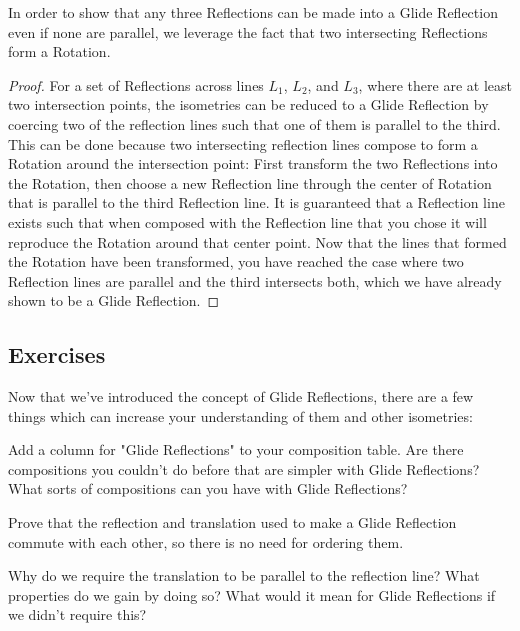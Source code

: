 \documentclass[11pt]{article}
\theoremstyle{definition}
\begin{document}
In order to show that any three Reflections can be made into a Glide
Reflection even if none are parallel, we leverage the fact that two
intersecting Reflections form a Rotation.

\begin{proof}
  For a set of Reflections across lines $L_{1}$, $L_{2}$, and $L_{3}$, where
  there are at least two intersection points, the isometries can be reduced to
  a Glide Reflection by coercing two of the reflection lines such that one of
  them is parallel to the third. This can be done because two intersecting
  reflection lines compose to form a Rotation around the intersection point:
  First transform the two Reflections into the Rotation, then choose a new
  Reflection line through the center of Rotation that is parallel to the third
  Reflection line. It is guaranteed that a Reflection line exists such that
  when composed with the Reflection line that you chose it will reproduce the
  Rotation around that center point. Now that the lines that formed the
  Rotation have been transformed, you have reached the case where two
  Reflection lines are parallel and the third intersects both, which we have
  already shown to be a Glide Reflection.
\end{proof}

\subsection{Exercises}

Now that we've introduced the concept of Glide Reflections, there are a few
things which can increase your understanding of them and other isometries:
\begin{enumeration}
\item Add a column for "Glide Reflections" to your composition table. Are there
  compositions you couldn't do before that are simpler with Glide Reflections?
  What sorts of compositions can you have with Glide Reflections?
\item Prove that the reflection and translation used to make a Glide Reflection
  commute with each other, so there is no need for ordering them.
\item Why do we require the translation to be parallel to the reflection line?
  What properties do we gain by doing so? What would it mean for Glide
  Reflections if we didn't require this?
\end{enumeration}
\end{document}

